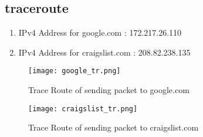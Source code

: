 \documentclass[12pt]{article}
\begin{document}
\subsection{traceroute}
\begin{enumerate}
    \item IPv4 Address for google.com : 172.217.26.110
    \item IPv4 Address for craigslist.com : 208.82.238.135
\end{enumerate}

\begin{figure}[h!]
    \centering
    \texttt{[image: google\_tr.png]}
    \caption{Trace Route of sending packet to google.com}
\end{figure}

\begin{figure}[h!]
    \centering
    \texttt{[image: craigslist\_tr.png]}
    \caption{Trace Route of sending packet to craigslist.com}
\end{figure}
\renewcommand{\labelenumi}{\Alph{enumi}}
\end{document}
